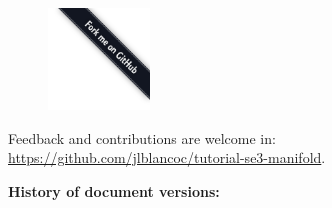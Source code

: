 \documentclass[a4paper,11pt]{report}
\begin{document}
\newpage

\begin{figure}
    \includegraphics[width=2.7cm]{imgs/forkme.png}
\end{figure}

Feedback and contributions are welcome in: \\
\url{https://github.com/jlblancoc/tutorial-se3-manifold}.

\vspace{2cm}

\textbf{History of document versions:}
\end{document}
